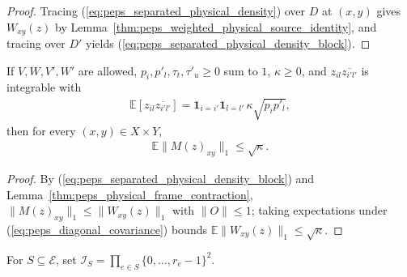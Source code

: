 \begin{proof}\leanok
    Tracing (\ref{eq:peps_separated_physical_density}) over $D$ at $(x,y)$ gives
    $W_{xy}(z)$ by Lemma~\ref{thm:peps_weighted_physical_source_identity}, and
    tracing over $D'$ yields (\ref{eq:peps_separated_physical_density_block}).
\end{proof}

\begin{lemma}
    \label{thm:peps_weighted_physical_source_bound}
    \leanok
    If $V,W,V',W'$ are allowed, $p_i,p'_l,\tau_t,\tau'_u\ge 0$ sum to $1$,
    $\kappa\geq0$, and $z_{il}\overline{z_{i'l'}}$ is integrable with
    \begin{align}
        \mathbb E[z_{il}\overline{z_{i'l'}}]
        =\mathbf1_{i=i'}\mathbf1_{l=l'}\,
        \kappa\sqrt{p_i p'_l},
        \label{eq:peps_diagonal_covariance}
    \end{align}
    then for every $(x,y)\in X\times Y$,
    \begin{align}
        \mathbb E\|M(z)_{xy}\|_1\leq\sqrt\kappa.
        \label{eq:peps_weighted_physical_source_bound}
    \end{align}
\end{lemma}

\begin{proof}\leanok
    By (\ref{eq:peps_separated_physical_density_block}) and
    Lemma~\ref{thm:peps_physical_frame_contraction},
    $\|M(z)_{xy}\|_1\le\|W_{xy}(z)\|_1$ with $\|O\|\le 1$; taking expectations
    under (\ref{eq:peps_diagonal_covariance}) bounds
    $\mathbb E\|W_{xy}(z)\|_1\le\sqrt\kappa$.
\end{proof}

\begin{definition}
    \label{def:peps_original_schmidt_coordinates}
    \leanok
    For $S\subseteq\mathcal E$, set
    $\mathcal I_S=\prod_{e\in S}\{0,\ldots,r_e-1\}^2$.
\end{definition}

